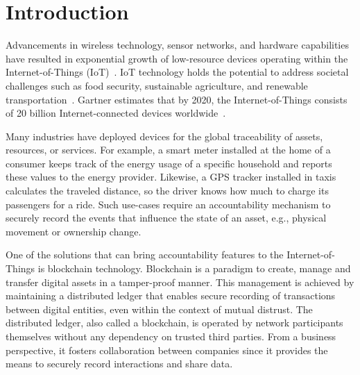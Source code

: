 \section{Introduction}
Advancements in wireless technology, sensor networks, and hardware capabilities have resulted in exponential growth of low-resource devices operating within the Internet-of-Things (IoT)~\cite{makhdoom2018blockchain}.
IoT technology holds the potential to address societal challenges such as food security, sustainable agriculture, and renewable transportation~\cite{atzori2017understanding}.
Gartner estimates that by 2020, the Internet-of-Things consists of 20 billion Internet-connected devices worldwide~\cite{hung2017leading}.

Many industries have deployed devices for the global traceability of assets, resources, or services.
For example, a smart meter installed at the home of a consumer keeps track of the energy usage of a specific household and reports these values to the energy provider.
Likewise, a GPS tracker installed in taxis calculates the traveled distance, so the driver knows how much to charge its passengers for a ride.
Such use-cases require an accountability mechanism to securely record the events that influence the state of an asset, e.g., physical movement or ownership change.

One of the solutions that can bring accountability features to the Internet-of-Things is blockchain technology.
Blockchain is a paradigm to create, manage and transfer digital assets in a tamper-proof manner.
This management is achieved by maintaining a distributed ledger that enables secure recording of transactions between digital entities, even within the context of mutual distrust.
The distributed ledger, also called a blockchain, is operated by network participants themselves without any dependency on trusted third parties.
From a business perspective, it fosters collaboration between companies since it provides the means to securely record interactions and share data. %

